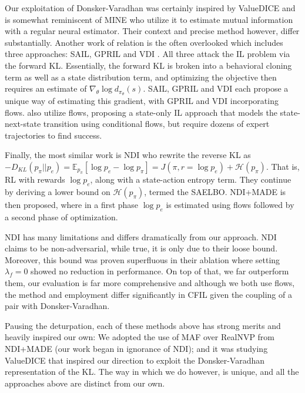 Our exploitation of Donsker-Varadhan was certainly inspired by ValueDICE and is somewhat reminiscent of MINE \cite{belghazi2018mine} who utilize it to estimate mutual information with a regular neural estimator. Their context and precise method however, differ substantially.
Another work of relation is the often overlooked \cite{schroecker2020manipulating} which includes three approaches: SAIL, GPRIL and VDI \cite{ schroecker2017state, schroecker2019generative, schroecker2020universal}. All three attack the IL problem via the forward KL. Essentially, the forward KL is broken into a behavioral cloning term as well as a state distribution term, and optimizing the objective then requires an estimate of $\nabla_\theta \log d_{\pi_\theta}(s)$. SAIL, GPRIL and VDI each propose a unique way of estimating this gradient, with GPRIL and VDI incorporating flows. \cite{chang2022flow} also utilize flows, proposing a state-only IL approach that models the state-next-state transition using conditional flows, but require dozens of expert trajectories to find success. 

Finally, the most similar work is NDI \cite{kim2021imitation} who rewrite the reverse KL as $-D_{KL}(p_\pi||p_{e}) = \mathbb{E}_{p_\pi}\left[\log p_e - \log p_\pi \right] = J(\pi, r{=}\log p_e) + \mathcal{H}(p_\pi).$ That is, RL with rewards $\log p_e$, along with a state-action entropy term. They continue by deriving a lower bound on $\mathcal{H}(p_\pi)$, termed the SAELBO. NDI+MADE is then proposed, where in a first phase $\log p_e$ is estimated using flows followed by a second phase of optimization.



NDI has many limitations and differs dramatically from our approach. NDI claims to be non-adversarial, while true, it is only due to their loose bound. Moreover, this bound was proven superfluous in their ablation where setting $\lambda_f {=} 0$ showed no reduction in performance. 
On top of that, we far outperform them, our evaluation is far more comprehensive and although we both use flows, the method and employment differ significantly in CFIL given the coupling of a pair with Donsker-Varadhan. 



Pausing the deturpation, each of these methods above has strong merits and heavily inspired our own: We adopted the use of MAF over RealNVP from NDI+MADE (our work began in ignorance of NDI); and it was studying ValueDICE that inspired our direction to exploit the Donsker-Varadhan representation of the KL. The way in which we do however, is unique, and all the approaches above are distinct from our own.

